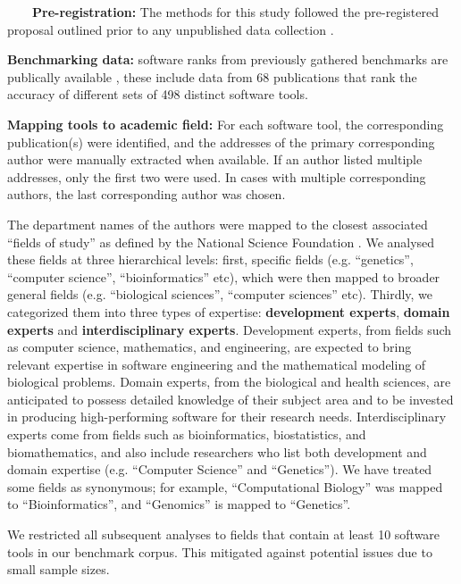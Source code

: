 \documentclass[fleqn,10pt,doc,onecolumn]{SelfArx}%
\begin{document}
~~~~\textbf{Pre-registration:} The methods for this study followed the pre-registered proposal outlined
prior to any unpublished data collection \cite{gardner2024}.

\textbf{Benchmarking data:} software ranks from previously gathered
benchmarks are publically available \cite{Gardner:2022}, these include data from
68 publications that rank the accuracy of different sets of 498
distinct software tools.


\textbf{Mapping tools to academic field:} For each software tool, the
corresponding publication(s) were identified, and the addresses of the
primary corresponding author were manually extracted when
available. If an author listed multiple addresses, only the first two
were used. In cases with multiple corresponding authors, the last
corresponding author was chosen.


The department names of the authors were mapped to the closest
associated ``fields of study'' as defined by the National Science
Foundation \cite{fields2014}. We analysed these fields at three
hierarchical levels: first, specific fields (e.g. ``genetics'',
``computer science'', ``bioinformatics'' etc), which were then mapped
to broader general fields (e.g. ``biological sciences'', ``computer
sciences'' etc). Thirdly, we categorized them into three types of
expertise: \textbf{development experts}, \textbf{domain experts} and
\textbf{interdisciplinary experts}.  Development experts, from fields
such as computer science, mathematics, and engineering, are expected
to bring relevant expertise in software engineering and the
mathematical modeling of biological problems. Domain experts, from the
biological and health sciences, are anticipated to possess detailed
knowledge of their subject area and to be invested in producing
high-performing software for their research needs. Interdisciplinary
experts come from fields such as bioinformatics, biostatistics, and
biomathematics, and also include researchers who list both development
and domain expertise (e.g. ``Computer Science'' and ``Genetics''). We
have treated some fields as synonymous; for example, ``Computational
Biology'' was mapped to ``Bioinformatics'', and ``Genomics'' is mapped
to ``Genetics''.

We restricted all subsequent analyses to fields that contain at least 10
software tools in our benchmark corpus. This mitigated against
potential issues due to small sample sizes. 
\end{document}
